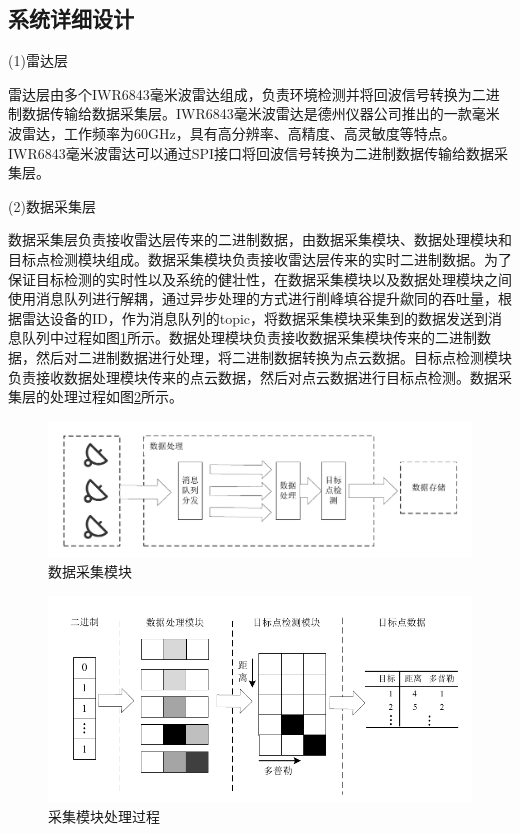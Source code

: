 \subsection{系统详细设计}

\par
(1)雷达层
\par
雷达层由多个IWR6843毫米波雷达组成，负责环境检测并将回波信号转换为二进制数据传输给数据采集层。IWR6843毫米波雷达是德州仪器公司推出的一款毫米波雷达，工作频率为60GHz，具有高分辨率、高精度、高灵敏度等特点。IWR6843毫米波雷达可以通过SPI接口将回波信号转换为二进制数据传输给数据采集层。

\par
(2)数据采集层
\par
数据采集层负责接收雷达层传来的二进制数据，由数据采集模块、数据处理模块和目标点检测模块组成。数据采集模块负责接收雷达层传来的实时二进制数据。为了保证目标检测的实时性以及系统的健壮性，在数据采集模块以及数据处理模块之间使用消息队列进行解耦，通过异步处理的方式进行削峰填谷提升歘同的吞吐量，根据雷达设备的ID，作为消息队列的topic，将数据采集模块采集到的数据发送到消息队列中过程如图\ref{fig:数据采集模块}所示。数据处理模块负责接收数据采集模块传来的二进制数据，然后对二进制数据进行处理，将二进制数据转换为点云数据。目标点检测模块负责接收数据处理模块传来的点云数据，然后对点云数据进行目标点检测。数据采集层的处理过程如图\ref{fig:采集模块处理过程}所示。
\begin{figure}[htbp]
    \centering
    \includegraphics[width=0.9\linewidth]{figures/数据采集模块.pdf}
    \caption{数据采集模块}
    \label{fig:数据采集模块}
\end{figure}

\begin{figure}[htbp]
    \centering
    \includegraphics[width=0.9\linewidth]{figures/采集模块处理过程.pdf}
    \caption{采集模块处理过程}
    \label{fig:采集模块处理过程}
\end{figure}

